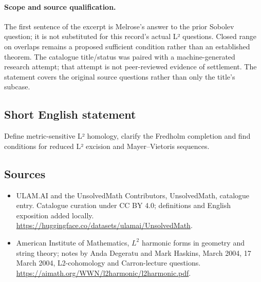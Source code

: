 \documentclass[11pt]{article}
\begin{document}
\paragraph{Scope and source qualification.}The first sentence of the excerpt is Melrose’s answer to the prior Sobolev question; it is not substituted for this record’s actual L² questions. Closed range on overlaps remains a proposed sufficient condition rather than an established theorem. The catalogue title/status was paired with a machine-generated research attempt; that attempt is not peer-reviewed evidence of settlement. The statement covers the original source questions rather than only the title’s subcase.
\subsection{Short English statement}
Define metric-sensitive L² homology, clarify the Fredholm completion and find conditions for reduced L² excision and Mayer–Vietoris sequences.
\subsection{Sources}
\begin{itemize}
\item[\hypertarget{source:statement:1}{S1}] ULAM.AI and the UnsolvedMath Contributors, UnsolvedMath, catalogue entry. Catalogue curation under CC BY 4.0; definitions and English exposition added locally.
\url{https://huggingface.co/datasets/ulamai/UnsolvedMath}.
\item[\hypertarget{source:statement:2}{S2}] American Institute of Mathematics, $L^2$ harmonic forms in geometry and string theory; notes by Anda Degeratu and Mark Haskins, March 2004, 17 March 2004, L2-cohomology and Carron-lecture questions.
\url{https://aimath.org/WWN/l2harmonic/l2harmonic.pdf}.
\end{itemize}
\label{end:statement}
\end{document}
